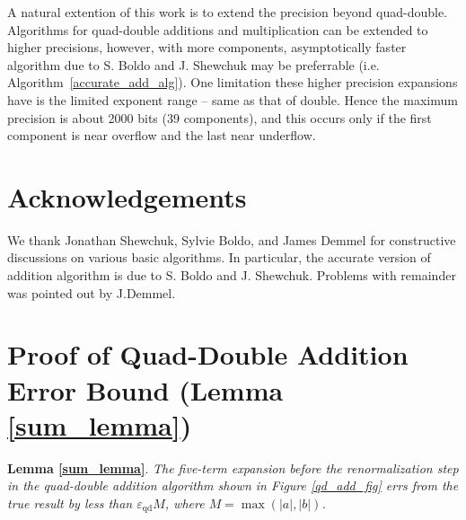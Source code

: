 \documentclass[11pt]{article}
\theoremstyle{definition}
\newcommand{\epsqd}{\varepsilon_\mathrm{qd}}
\begin{document}
A natural extention of this work is to extend the precision beyond
quad-double.  Algorithms for quad-double additions and multiplication
can be extended to higher precisions, however, with more components, 
asymptotically faster algorithm due to S. Boldo and J. Shewchuk may
be preferrable (i.e. Algorithm~\ref{accurate_add_alg}).
One limitation these higher precision expansions have
is the limited exponent range -- same as that of double.  Hence 
the maximum precision is about 2000 bits (39 components), 
and this occurs only if the first component is near overflow and the 
last near underflow.

\section{Acknowledgements}
We thank Jonathan Shewchuk, 
Sylvie Boldo, and James Demmel for constructive discussions on 
various basic algorithms.  In particular, the accurate version of 
addition algorithm is due to S. Boldo and J. Shewchuk.  Problems with
remainder was pointed out by J.Demmel.

\appendix
\newpage
\section{Proof of Quad-Double Addition Error Bound (Lemma \ref{sum_lemma})}
\label{proof_appendix}

\noindent
{\bf Lemma \ref{sum_lemma}}. 
\emph{The five-term expansion before the renormalization step in the
quad-double addition algorithm shown in Figure \ref{qd_add_fig} errs 
from the true result by less than $\epsqd M$, where $M = \max(|a|, |b|)$.}
\end{document}
